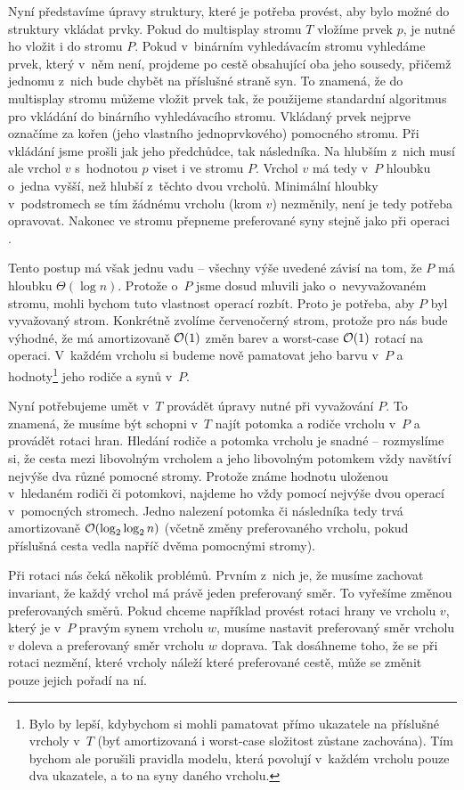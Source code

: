 Nyní představíme úpravy struktury, které je potřeba provést, aby bylo možné do
struktury vkládat prvky.  Pokud do multisplay stromu $T$ vložíme prvek $p$, je
nutné ho vložit i do stromu $P$. Pokud v~binárním vyhledávacím stromu vyhledáme
prvek, který v~něm není, projdeme po cestě obsahující oba jeho sousedy, přičemž
jednomu z~nich bude chybět na příslušné straně syn. To znamená, že do
multisplay stromu můžeme vložit prvek tak, že použijeme standardní algoritmus
pro vkládání do binárního vyhledávacího stromu. Vkládaný prvek nejprve označíme
za kořen (jeho vlastního jednoprvkového) pomocného stromu. Při vkládání jsme prošli
jak jeho předchůdce, tak následníka. Na hlubším z~nich musí ale vrchol $v$
s~hodnotou $p$ viset i ve stromu $P$. Vrchol $v$ má tedy v~$P$ hloubku o~jedna vyšší,
než hlubší z~těchto dvou vrcholů. Minimální hloubky v~podstromech se tím
žádnému vrcholu (krom $v$) nezměnily, není je tedy potřeba opravovat. Nakonec
ve stromu přepneme preferované syny stejně jako při operaci .

Tento postup má však jednu vadu -- všechny výše uvedené závisí na tom, že
$P$ má hloubku $\Theta(\log n)$. Protože o~$P$ jsme dosud mluvili jako
o~nevyvažovaném stromu, mohli bychom tuto vlastnost operací  rozbít.
Proto je potřeba, aby $P$ byl vyvažovaný strom. Konkrétně zvolíme červenočerný
strom, protože pro nás bude výhodné, že má amortizovaně $\mathcal O(1)$ změn barev a
worst-case $\mathcal O(1)$ rotací na operaci. V~každém vrcholu si budeme nově pamatovat
jeho barvu v~$P$ a hodnoty\footnote{Bylo by lepší, kdybychom si mohli pamatovat
přímo ukazatele na příslušné vrcholy v~$T$ (byť amortizovaná i worst-case složitost zůstane zachována). Tím bychom ale
porušili pravidla modelu, která povolují v~každém vrcholu pouze dva ukazatele,
a to na syny daného vrcholu.} jeho rodiče a synů v~$P$. 

Nyní potřebujeme umět v~$T$ provádět úpravy nutné při vyvažování $P$. To
znamená, že musíme být schopni v~$T$ najít potomka a rodiče vrcholu v~$P$ a provádět
rotaci hran. Hledání rodiče a potomka vrcholu je snadné -- rozmyslíme si, že
cesta mezi libovolným vrcholem a jeho libovolným potomkem vždy navštíví nejvýše
dva různé pomocné stromy. Protože známe hodnotu uloženou v~hledaném rodiči či
potomkovi, najdeme ho vždy pomocí nejvýše dvou operací  v~pomocných
stromech. Jedno nalezení potomka či následníka tedy trvá amortizovaně
$\o(\log\log n)$ (včetně změny preferovaného vrcholu, pokud příslušná cesta
vedla napříč dvěma pomocnými stromy).

Při rotaci nás čeká několik problémů. Prvním z~nich je, že musíme zachovat
invariant, že každý vrchol má právě jeden preferovaný směr. To vyřešíme změnou
preferovaných směrů. Pokud chceme například provést rotaci hrany ve vrcholu
$v$, který je v~$P$ pravým synem vrcholu $w$, musíme nastavit preferovaný směr
vrcholu $v$ doleva a preferovaný směr vrcholu $w$ doprava. Tak dosáhneme toho,
že se při rotaci nezmění, které vrcholy náleží které preferované cestě,
může se změnit pouze jejich pořadí na ní.

